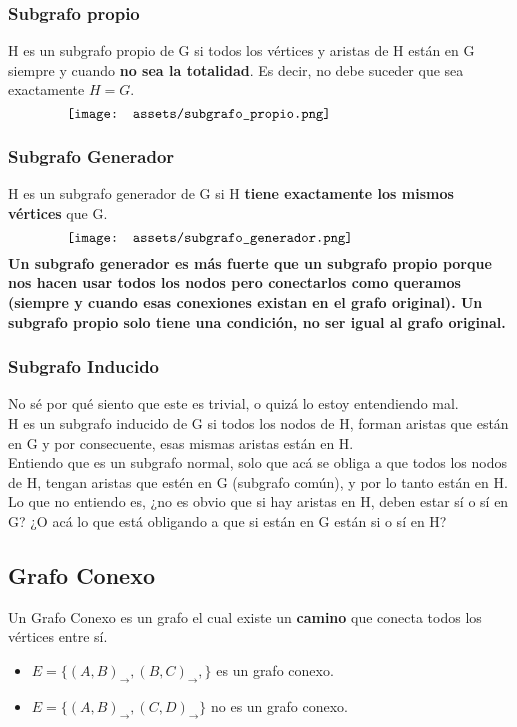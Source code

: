 \documentclass[10pt,a4paper]{article}
\begin{document}
\subsubsection*{Subgrafo propio}
H es un subgrafo propio de G si todos los vértices y aristas de H están en G siempre y cuando \textbf{no sea la totalidad}. Es decir, no debe suceder que sea exactamente $H = G$.
\[\begin{minipage}[b]{0.8\textwidth}
    \texttt{[image: assets/subgrafo\_propio.png]}
\end{minipage}\]
\subsubsection*{Subgrafo Generador}
H es un subgrafo generador de G si H \textbf{tiene exactamente los mismos vértices} que G. 
\[\begin{minipage}[b]{0.8\textwidth}
    \texttt{[image: assets/subgrafo\_generador.png]}
\end{minipage}\]
\textbf{Un subgrafo generador es más fuerte que un subgrafo propio porque nos hacen usar todos los nodos pero conectarlos como queramos (siempre y cuando esas conexiones existan en el grafo original). Un subgrafo propio solo tiene una condición, no ser igual al grafo original.}
\subsubsection*{Subgrafo Inducido}
No sé por qué siento que este es trivial, o quizá lo estoy entendiendo mal. \\
H es un subgrafo inducido de G si todos los nodos de H, forman aristas que están en G y por consecuente, esas mismas aristas están en H. \\
Entiendo que es un subgrafo normal, solo que acá se obliga a que todos los nodos de H, tengan aristas que estén en G (subgrafo común), y por lo tanto están en H. \\
Lo que no entiendo es, ¿no es obvio que si hay aristas en H, deben estar sí o sí en G? ¿O acá lo que está obligando a que si están en G están si o sí en H?
\subsection*{Grafo Conexo}
Un Grafo Conexo es un grafo el cual existe un \textbf{camino} que conecta todos los vértices entre sí. 
\begin{itemize}
    \item $E = \{(A,B)_{\rightarrow}, (B, C)_{\rightarrow}, \}$ es un grafo conexo.
    \item $E = \{(A, B)_{\rightarrow}, (C, D)_{\rightarrow}\}$ no es un grafo conexo.
\end{itemize}
\end{document}
